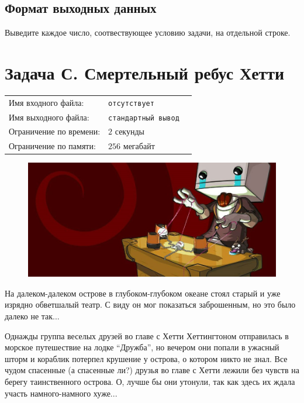 \documentclass[12pt]{scrartcl}
\newcommand{\inputFile}{отсутствует}
\newcommand{\outputFile}{стандартный вывод}
\begin{document}
\subsection*{Формат выходных данных}
Выведите каждое число, соотвествующее условию задачи, на отдельной строке.

\newpage

\section*{Задача С. Смертельный ребус Хетти}

\begin{tabularx}{\textwidth}{l l X}
    Имя входного файла: & \texttt{\inputFile} \\
    Имя выходного файла: & \texttt{\outputFile} \\
    Ограничение по времени: & $2$ секунды \\
    Ограничение по памяти: & $256$ мегабайт \\
\end{tabularx}

\begin{figure}[h]
	\centering
    \includegraphics[width=1\linewidth]{Cat}
\end{figure}

На далеком-далеком острове в глубоком-глубоком океане стоял старый и уже изрядно обветшалый театр. С виду он мог показаться заброшенным, но это было далеко не так...

Однажды группа веселых друзей во главе с Хетти Хеттингтоном отправилась в морское путешествие на лодке ``Дружба'', но вечером они попали в ужасный шторм и кораблик потерпел крушение у острова, о котором никто не знал.
Все чудом спасенные (а спасенные ли?) друзья во главе с Хетти лежили без чувств на берегу таинственного острова. О, лучше бы они утонули, так как здесь их ждала участь намного-намного хуже...
\end{document}
